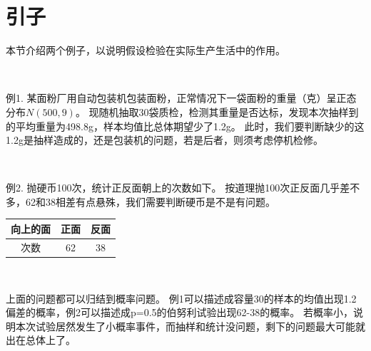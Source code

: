 \section{引子}

本节介绍两个例子，以说明假设检验在实际生产生活中的作用。

~

例1. 某面粉厂用自动包装机包装面粉，正常情况下一袋面粉的重量（克）呈正态分布$N\left( 500,9 \right) $。
现随机抽取30袋质检，检测其重量是否达标，发现本次抽样到的平均重量为498.8g，样本均值比总体期望少了1.2g。
此时，我们要判断缺少的这1.2g是抽样造成的，还是包装机的问题，若是后者，则须考虑停机检修。

~

例2. 抛硬币100次，统计正反面朝上的次数如下。
按道理抛100次正反面几乎差不多，62和38相差有点悬殊，我们需要判断硬币是不是有问题。
\begin{table}[h]
\centering
\begin{tabular}{ccc}
    \toprule
    向上的面 & 正面 & 反面\\
    \midrule
    次数 & 62 & 38\\
    \bottomrule
\end{tabular}
\end{table}

~

上面的问题都可以归结到概率问题。
例1可以描述成容量30的样本的均值出现1.2偏差的概率，例2可以描述成p=0.5的伯努利试验出现62-38的概率。
若概率小，说明本次试验居然发生了小概率事件，而抽样和统计没问题，剩下的问题最大可能就出在总体上了。




